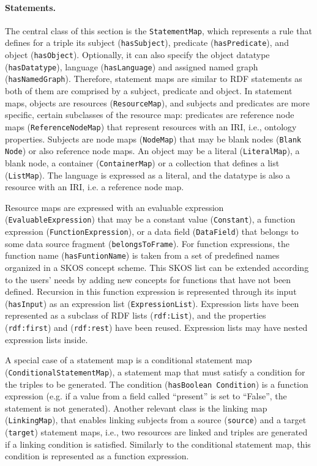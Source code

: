 \noindent\paragraph{\textbf{Statements.}} The central class of this section is the \texttt{StatementMap}, which represents a rule that defines for a triple its subject (\texttt{hasSubject}), predicate (\texttt{hasPredicate}), and object (\texttt{hasObject}). Optionally, it can also specify the object datatype (\texttt{hasDatatype}), language (\texttt{hasLanguage}) and assigned named graph (\texttt{hasNamedGraph}). Therefore, statement maps are similar to RDF statements as both of them are comprised by a subject, predicate and object. In statement maps, objects are resources (\texttt{ResourceMap}), and subjects and predicates are more specific, certain subclasses of the resource map: predicates are reference node maps (\texttt{ReferenceNodeMap}) that represent resources with an IRI, i.e., ontology properties. Subjects are node maps (\texttt{NodeMap}) that may be blank nodes (\texttt{Blank Node}) or also reference node maps. An object may be a literal (\texttt{LiteralMap}), a blank node, a container (\texttt{ContainerMap}) or a collection that defines a list (\texttt{ListMap}). The language is expressed as a literal, and the datatype is also a resource with an IRI, i.e. a reference node map.

Resource maps are expressed with an evaluable expression (\texttt{EvaluableExpression}) that may be a constant value (\texttt{Constant}), a function expression (\texttt{FunctionExpression}), or a data field (\texttt{DataField}) that belongs to some data source fragment (\texttt{belongsToFrame}). For function expressions, the function name (\texttt{hasFuntionName}) is taken from a set of predefined names organized in a SKOS concept scheme. This SKOS list can be extended according to the users' needs by adding new concepts for functions that have not been defined. Recursion in this function expression is represented through its input (\texttt{hasInput}) as an expression list (\texttt{ExpressionList}). Expression lists have been represented as a subclass of RDF lists (\texttt{rdf:List}), and the properties (\texttt{rdf:first}) and (\texttt{rdf:rest}) have been reused. Expression lists may have nested expression lists inside.


A special case of a statement map is a conditional statement map (\texttt{ConditionalStatementMap}), a statement map that must satisfy a condition for the triples to be generated. The condition (\texttt{hasBoolean Condition}) is a function expression (e.g. if a value from a field called ``present'' is set to ``False'', the statement is not generated). Another relevant class is the linking map (\texttt{LinkingMap}), that enables linking subjects from a source (\texttt{source}) and a target (\texttt{target}) statement maps, i.e., two resources are linked and triples are generated if a linking condition is satisfied. Similarly to the conditional statement map, this condition is represented as a function expression.

